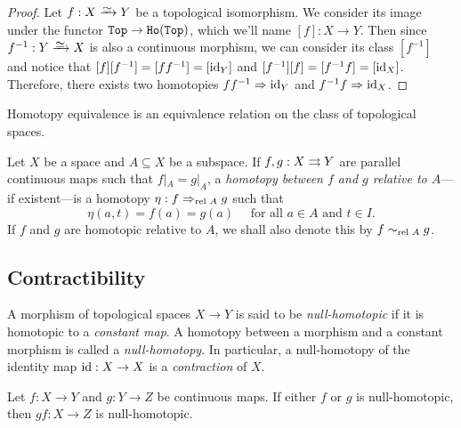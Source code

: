 \begin{proof}
    Let \(f: X \isoto Y\) be a topological isomorphism. We consider its image
    under the functor \({\texttt{Top}} \to {\texttt{Ho}(\texttt{Top})}\), which we'll name \([f]: X \to Y\). Then
    since \(f^{-1}: Y \isoto X\) is also a continuous morphism, we can consider its
    class \([f^{-1}]\) and notice that \([f] [f^{-1}] = [f f^{-1}] = [\operatorname{id}_Y]\) and
    \([f^{-1}] [f] = [f^{-1} f] = [\operatorname{id}_X]\). Therefore, there exists two homotopies
    \(f f^{-1} \Rightarrow \operatorname{id}_Y\) and \(f^{-1} f \Rightarrow \operatorname{id}_X\).
\end{proof}

\begin{corollary}
    \label{cor:htpy-equiv-is-equiv-relation}
    Homotopy equivalence is an equivalence relation on the class of topological
    spaces.
\end{corollary}

\begin{definition}
    \label{def:relative-homotopy}
    Let \(X\) be a space and \(A \subseteq X\) be a subspace. If \(f, g: X \rightrightarrows Y\)
    are parallel continuous maps such that \(f|_A = g|_A\), a \emph{homotopy between
        \(f\) and \(g\) relative to \(A\)}---if existent---is a homotopy
    \(\eta: f \Rightarrow_{\text{rel }{A}} g\) such that
    \[
        \eta(a, t) = f(a) = g(a)\quad\text{ for all } a \in A \text{ and } t \in I.
    \]
    If \(f\) and \(g\) are homotopic relative to \(A\), we shall also denote this by
    \(f \sim_{\text{rel }{A}} g\).
\end{definition}

\subsection{Contractibility}

\begin{definition}
    \label{def:null-homotopy}
    A morphism of topological spaces \(X \to Y\) is said to be \emph{null-homotopic}
    if it is homotopic to a \emph{constant map}. A homotopy between a morphism and a
    constant morphism is called a \emph{null-homotopy}. In particular, a null-homotopy of the identity map \(\operatorname{id}: X \to X\) is a \emph{contraction} of \(X\).
\end{definition}

\begin{proposition}
    \label{prop:composition-null-homotopic-iff-some-is-null-homotopic}
    Let \(f: X \to Y\) and \(g: Y \to Z\) be continuous maps. If either \(f\) or
    \(g\) is null-homotopic, then \(g f: X \to Z\) is null-homotopic.
\end{proposition}

